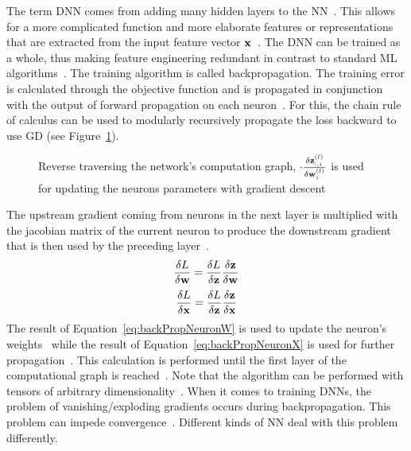 The term \ac{DNN} comes from adding many hidden layers to the \ac{NN}~\citep{shrestha_review_2019}.
This allows for a more complicated function and more elaborate features or representations that
are extracted from the input feature vector $\textbf{x}$~\citep{oyedotun_deep_2015}.
The \ac{DNN} can be trained as a whole, thus making feature engineering redundant in contrast to
standard \ac{ML} algorithms~\citep{arpteg_software_2018}.
The training algorithm is called backpropagation.
The training error is calculated through the objective function and is propagated
in conjunction with the output of forward propagation on each neuron~\citep{goodfellow_deep_2016}.
For this, the chain rule of calculus can be used to modularly recursively propagate the
loss backward to use \ac{GD} (see Figure~\ref{fig:error-backpropagation}).
\begin{figure}[ht]
	\centering
    
	\caption[Backpropagation of errors through the network.]{%
        Reverse traversing the network's computation graph,
        $\cdot \frac{\delta \textbf{z}_{:,i}^{(l)}}{\delta \textbf{w}_i^{(l)}}$ is used for
        updating the neurons parameters with gradient descent\label{fig:error-backpropagation}
    }
\end{figure}
The upstream gradient coming from neurons in the next layer is multiplied with the
jacobian matrix of the current neuron to produce the downstream gradient that is then used by
the preceding layer~\citep{boue_deep_2018,goodfellow_deep_2016}.
\begin{equation}\label{eq:backPropNeuronW}
    \frac{\delta L}{\delta\textbf{w}} = \frac{\delta L}{\delta\textbf{z}} \frac{\delta\textbf{z}}{\delta\textbf{w}}
\end{equation}
\begin{equation}\label{eq:backPropNeuronX}
    \frac{\delta L}{\delta\textbf{x}} = \frac{\delta L}{\delta\textbf{z}}\frac{\delta\textbf{z}}{\delta\textbf{x}}
\end{equation}
The result of Equation~\ref{eq:backPropNeuronW} is used to update the neuron's weights \w\ while
the result of Equation~\ref{eq:backPropNeuronX} is used for further
propagation~\citep{boue_deep_2018}.
This calculation is performed until the first layer of the computational graph is
reached~\citep{goodfellow_deep_2016}.
Note that the algorithm can be performed with tensors of arbitrary
dimensionality~\citep{goodfellow_deep_2016}.
When it comes to training \acp{DNN}, the problem of vanishing/exploding gradients occurs during
backpropagation.
This problem can impede convergence~\citep{he_deep_2015}.
Different kinds of \ac{NN} deal with this problem differently.

